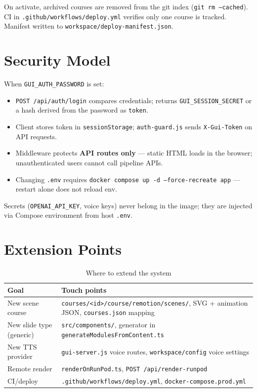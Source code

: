\documentclass{scinexus}
\newcommand{\tableheadrow}[1]{\sffamily\bfseries\color{rbnavy} #1}
\begin{document}
On activate, archived courses are removed from the git index (\texttt{git rm --cached}). CI in \texttt{.github/workflows/deploy.yml} verifies only one course is tracked. Manifest written to \texttt{workspace/deploy-manifest.json}.

\section{Security Model}

When \texttt{GUI\_AUTH\_PASSWORD} is set:

\begin{itemize}
	\item \texttt{POST /api/auth/login} compares credentials; returns \texttt{GUI\_SESSION\_SECRET} or a hash derived from the password as \texttt{token}.
	\item Client stores token in \texttt{sessionStorage}; \texttt{auth-guard.js} sends \texttt{X-Gui-Token} on API requests.
	\item Middleware protects \textbf{API routes only} --- static HTML loads in the browser; unauthenticated users cannot call pipeline APIs.
	\item Changing \texttt{.env} requires \texttt{docker compose up -d --force-recreate app} --- restart alone does not reload env.
\end{itemize}

Secrets (\texttt{OPENAI\_API\_KEY}, voice keys) never belong in the image; they are injected via Compose environment from host \texttt{.env}.

\section{Extension Points}

\begin{table}[htbp]
	\centering
	\footnotesize
	\caption{Where to extend the system}
	\begin{tabularx}{\textwidth}{@{}l L@{}}
		\toprule
		\tableheadrow{Goal} & \tableheadrow{Touch points} \\
		\midrule
		New scene course & \texttt{courses/<id>/course/remotion/scenes/}, SVG + animation JSON, \texttt{courses.json} mapping \\
		New slide type (generic) & \texttt{src/components/}, generator in \texttt{generateModulesFromContent.ts} \\
		New TTS provider & \texttt{gui-server.js} voice routes, \texttt{workspace/config} voice settings \\
		Remote render & \texttt{renderOnRunPod.ts}, \texttt{POST /api/render-runpod} \\
		CI/deploy & \texttt{.github/workflows/deploy.yml}, \texttt{docker-compose.prod.yml} \\
		\bottomrule
	\end{tabularx}
\end{table}
\end{document}

